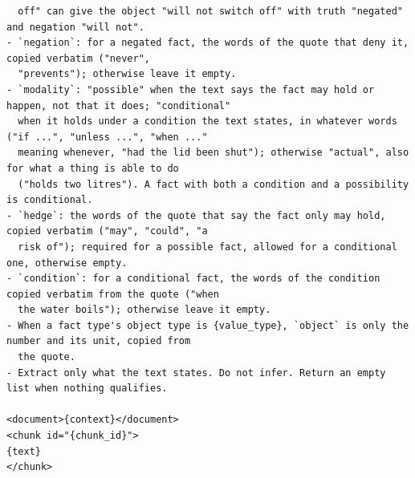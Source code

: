 \begin{lstlisting}
  off" can give the object "will not switch off" with truth "negated" and negation "will not".
- `negation`: for a negated fact, the words of the quote that deny it, copied verbatim ("never",
  "prevents"); otherwise leave it empty.
- `modality`: "possible" when the text says the fact may hold or happen, not that it does; "conditional"
  when it holds under a condition the text states, in whatever words ("if ...", "unless ...", "when ..."
  meaning whenever, "had the lid been shut"); otherwise "actual", also for what a thing is able to do
  ("holds two litres"). A fact with both a condition and a possibility is conditional.
- `hedge`: the words of the quote that say the fact only may hold, copied verbatim ("may", "could", "a
  risk of"); required for a possible fact, allowed for a conditional one, otherwise empty.
- `condition`: for a conditional fact, the words of the condition copied verbatim from the quote ("when
  the water boils"); otherwise leave it empty.
- When a fact type's object type is {value_type}, `object` is only the number and its unit, copied from
  the quote.
- Extract only what the text states. Do not infer. Return an empty list when nothing qualifies.

<document>{context}</document>
<chunk id="{chunk_id}">
{text}
</chunk>
\end{lstlisting}

